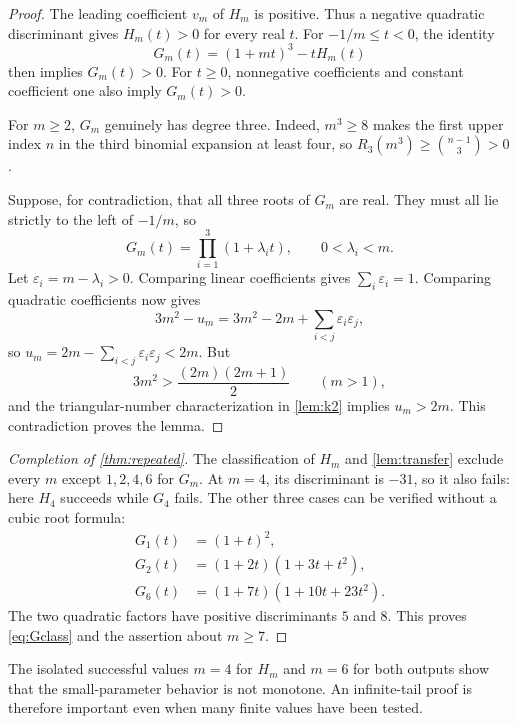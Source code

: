 \documentclass[11pt,letterpaper]{article}
\numberwithin{equation}{section}
\newtheorem{lemma}[theorem]{Lemma}
\theoremstyle{definition}
\theoremstyle{remark}
\begin{document}
\begin{proof}
The leading coefficient $v_m$ of $H_m$ is positive. Thus a negative
quadratic discriminant gives $H_m(t)>0$ for every real $t$. For
$-1/m\le t<0$, the identity
\[
 G_m(t)=(1+mt)^3-tH_m(t)
\]
then implies $G_m(t)>0$. For $t\ge0$, nonnegative coefficients and constant
coefficient one also imply $G_m(t)>0$.

For $m\ge2$, $G_m$ genuinely has degree three. Indeed, $m^3\ge8$ makes the
first upper index $n$ in the third binomial expansion at least four, so
$R_3(m^3)\ge\binom{n-1}{3}>0$.

Suppose, for contradiction, that all three roots of $G_m$ are real. They
must all lie strictly to the left of $-1/m$, so
\[
 G_m(t)=\prod_{i=1}^3(1+\lambda_it),\qquad 0<\lambda_i<m.
\]
Let $\varepsilon_i=m-\lambda_i>0$. Comparing linear coefficients gives
$\sum_i\varepsilon_i=1$. Comparing quadratic coefficients now gives
\[
 3m^2-u_m=3m^2-2m+
     \sum_{i<j}\varepsilon_i\varepsilon_j,
\]
so $u_m=2m-\sum_{i<j}\varepsilon_i\varepsilon_j<2m$.
But
\[
 3m^2>\frac{(2m)(2m+1)}2\qquad(m>1),
\]
and the triangular-number characterization in \cref{lem:k2} implies
$u_m>2m$. This contradiction proves the lemma.
\end{proof}

\begin{proof}[Completion of \cref{thm:repeated}]
The classification of $H_m$ and \cref{lem:transfer} exclude every $m$ except
$1,2,4,6$ for $G_m$. At $m=4$, its discriminant is $-31$, so it also fails:
here $H_4$ succeeds while $G_4$ fails. The other three cases can be verified
without a cubic root formula:
\begin{align*}
 G_1(t)&=(1+t)^2,\\
 G_2(t)&=(1+2t)(1+3t+t^2),\\
 G_6(t)&=(1+7t)(1+10t+23t^2).
\end{align*}
The two quadratic factors have positive discriminants $5$ and $8$.
This proves \eqref{eq:Gclass} and the assertion about $m\ge7$.
\end{proof}

The isolated successful values $m=4$ for $H_m$ and $m=6$ for both outputs
show that the small-parameter behavior is not monotone. An infinite-tail
proof is therefore important even when many finite values have been tested.
\end{document}
